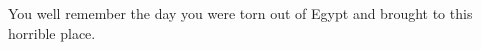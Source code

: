 \documentclass[char]{guardians}
\begin{document}
\name{\cIsis{}}


















You well remember the day you were torn out of Egypt and brought to this horrible place.

\end{document}
